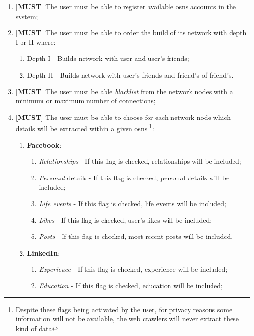 \begin{enumerate}
    \item \textbf{[MUST]} The user must be able to register available \glspl{osn} accounts in the system;
    \item \textbf{[MUST]} The user must be able to order the build of its network with depth I or II where:
    \begin{enumerate}
        \item Depth I - Builds network with user and user's friends;
        \item Depth II - Builds network with user's friends and friend's of friend's.
    \end{enumerate}
    \item \textbf{[MUST]} The user must be able \textit{blacklist} from the network nodes with a minimum or maximum number of connections;
    \item \textbf{[MUST]} The user must be able to choose for each network node which details will be extracted within a given \glspl{osn} \footnote{Despite these flags being activated by the user, for privacy reasons some information will not be available, the web crawlers will never extract these kind of data}:
    \begin{enumerate}
        \item \textbf{Facebook}:
        \begin{enumerate}
            \item \textit{Relationships} - If this flag is checked, relationships will be included;
            \item \textit{Personal} details - If this flag is checked, personal details will be included;
            \item \textit{Life events} - If this flag is checked, life events will be included;
            \item \textit{Likes} - If this flag is checked, user's likes will be included;
            \item \textit{Posts} - If this flag is checked, most recent posts will be included.
        \end{enumerate}
        \item \textbf{LinkedIn}:
        \begin{enumerate}
            \item \textit{Experience} - If this flag is checked, experience will be included;
            \item \textit{Education} - If this flag is checked, education will be included;

\end{enumerate}
\end{enumerate}
\end{enumerate}
